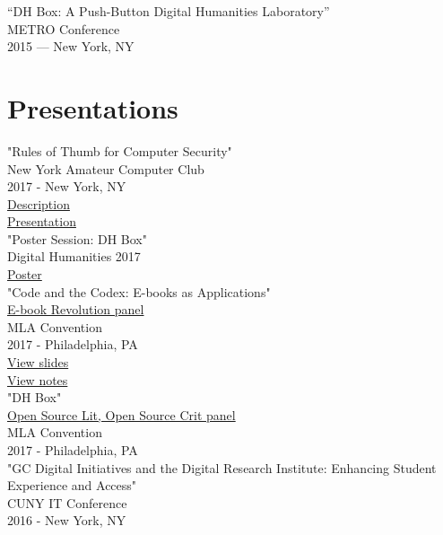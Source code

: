\documentclass[11pt]{article}
\begin{document}
“DH Box: A Push-Button Digital Humanities Laboratory”\\
METRO Conference\\
2015 — New York, NY\\

\section*{Presentations}
\label{sec:orgheadline8}
"Rules of Thumb for Computer Security"\\
New York Amateur Computer Club\\
2017 - New York, NY\\
\href{http://nyacc.org/}{Description}\\
\href{http://htmlpreview.github.io/?https://github.com/smythp/security-workshop/blob/master/presentation/index.html#/sec-title-slide}{Presentation}\\

"Poster Session: DH Box"\\
Digital Humanities 2017\\
\href{https://smythp.com/images/dh_box_poster.pdf}{Poster}\\

"Code and the Codex: E-books as Applications"\\
\href{https://apps.mla.org/program_details?prog_id=75&year=2017}{E-book Revolution panel}\\
MLA Convention\\
2017 - Philadelphia, PA\\
\href{http://htmlpreview.github.io/?https://github.com/smythp/ebooks-as-applications/blob/master/presentation.html#/sec-title-slide}{View slides}\\
\href{https://github.com/smythp/ebooks-as-applications#ebooks-as-applications}{View notes}\\

"DH Box"\\
\href{https://text.mla.hcommons.org/}{Open Source Lit, Open Source Crit panel}\\
MLA Convention\\
2017 - Philadelphia, PA\\

"GC Digital Initiatives and the Digital Research Institute: Enhancing Student Experience and Access"\\
CUNY IT Conference\\
2016 - New York, NY\\
\end{document}

